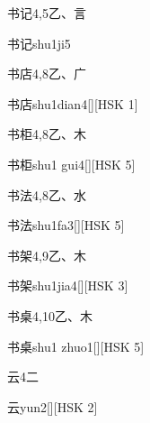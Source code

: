 \begin{entry}{书记}{4,5}{⼄、⾔}
  \begin{phonetics}{书记}{shu1ji5}
  \end{phonetics}
\end{entry}

\begin{entry}{书店}{4,8}{⼄、⼴}
  \begin{phonetics}{书店}{shu1dian4}[][HSK 1]
  \end{phonetics}
\end{entry}

\begin{entry}{书柜}{4,8}{⼄、⽊}
  \begin{phonetics}{书柜}{shu1 gui4}[][HSK 5]
  \end{phonetics}
\end{entry}

\begin{entry}{书法}{4,8}{⼄、⽔}
  \begin{phonetics}{书法}{shu1fa3}[][HSK 5]
  \end{phonetics}
\end{entry}

\begin{entry}{书架}{4,9}{⼄、⽊}
  \begin{phonetics}{书架}{shu1jia4}[][HSK 3]
  \end{phonetics}
\end{entry}

\begin{entry}{书桌}{4,10}{⼄、⽊}
  \begin{phonetics}{书桌}{shu1 zhuo1}[][HSK 5]
  \end{phonetics}
\end{entry}

\begin{entry}{云}{4}{⼆}
  \begin{phonetics}{云}{yun2}[][HSK 2]
  \end{phonetics}
\end{entry}

